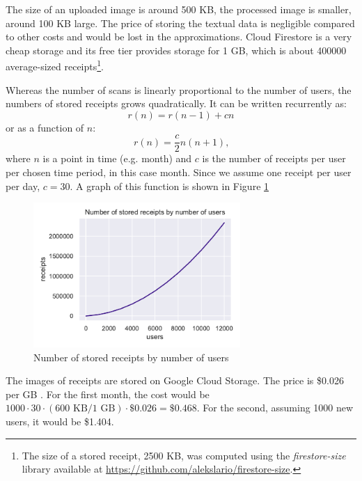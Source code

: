 \documentclass[
  digital, %
  table,   %
  oneside, %
  lof,     %
  lot,     %
]{fithesis3}
\begin{document}
The size of an uploaded image is around 500 KB, the processed image is smaller, around 100 KB large. The price of storing the textual data is negligible compared to other costs and would be lost in the approximations. Cloud Firestore is a very cheap storage \cite{CloudFirestorePricing} and its free tier provides storage for 1 GB, which is about \num{400000} average-sized receipts\footnote{The size of a stored receipt, \num{2500} KB, was computed using the \textit{firestore-size} library available at \url{https://github.com/alekslario/firestore-size}.}.

Whereas the number of scans is linearly proportional to the number of users, the numbers of stored receipts grows quadratically. It can be written recurrently as: 
\begin{equation}
r(n) = r(n-1) + cn
\end{equation}
or as a function of $n$:
\begin{equation}
r(n) = \frac{c}{2}n(n + 1)\text{,}
\end{equation}
where $n$ is a point in time (e.g. month) and $c$ is the number of receipts per user per chosen time period, in this case month. Since we assume one receipt per user per day, $c = 30$. A graph of this function is shown in Figure \ref{fig:receipts_by_users}

\begin{figure}
    \begin{center}
        \includegraphics[width=0.7\textwidth]{figures/graphs/receipts_by_users}
    \end{center}
    \caption{Number of stored receipts by number of users}
    \label{fig:receipts_by_users}
\end{figure}

The images of receipts are stored on Google Cloud Storage. The price is \$0.026 per GB \cite{CloudStoragePricing}. For the first month, the cost would be $\num{1000}\cdot30\cdot(600\text{ KB} / 1\text{ GB})\cdot\$0.026 = \$0.468$.
For the second, assuming \num{1000} new users, it would be \$1.404.
\end{document}
